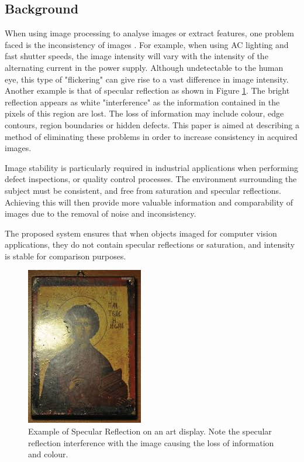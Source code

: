 \documentclass[fleqn,twoside]{article}
\begin{document}
\subsection{Background}


When using image processing to analyse images or extract features, one problem faced is the inconsistency of images \cite{atkinson}.  For example, when using AC lighting and fast shutter speeds, the image intensity will vary with the intensity of the alternating current in the power supply. Although undetectable to the human eye, this type of "flickering" can give rise to a vast difference in image intensity. Another example is that of specular reflection as shown in Figure \ref{fig:specular_art}. The bright reflection appears as white "interference" as the information contained in the pixels of this region are lost. The loss of information may include colour, edge contours, region boundaries or hidden defects. This paper is aimed at describing a method of eliminating these problems in order to increase consistency in acquired images.

Image stability is particularly required in industrial applications when performing defect inspections, or quality control processes. The environment surrounding the subject must be consistent, and free from saturation and specular reflections. Achieving this will then provide more valuable information and comparability of images due to the removal of noise and inconsistency.

The proposed system ensures that when objects imaged for computer vision applications, they do not contain specular reflections or saturation, and intensity is stable for comparison purposes. 

\begin{figure}[h]
	\centering
	\includegraphics[scale=0.9]{specular_art.jpg}
	\caption{Example of Specular Reflection on an art display. Note the specular reflection interference with the image causing the loss of information and colour.}
	\label{fig:specular_art}
\end{figure}
\end{document}
